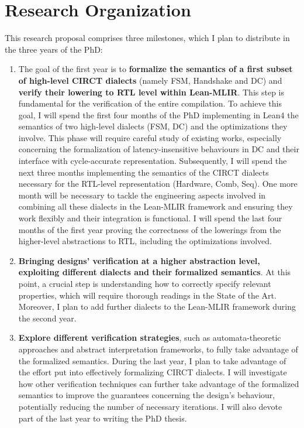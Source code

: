 \documentclass[sigconf,authorversion,nonacm, 11pt]{acmart}
\begin{document}
\section{Research Organization}

This research proposal comprises three milestones, which I plan to distribute in the three years of the PhD: 
\begin{enumerate}
    \item The goal of the first year is to \textbf{formalize the semantics of a first subset of high-level CIRCT dialects} (namely FSM, Handshake and DC) 
 and \textbf{verify their lowering to RTL level within Lean-MLIR}. This step is fundamental for the verification of the entire compilation. 
 To achieve this goal, I will spend the first four months of the PhD implementing in Lean4 the semantics of two high-level dialects (FSM, DC) and 
 the optimizations they involve. This phase will require careful study of existing works, especially concerning the formalization of latency-insensitive 
 behaviours in DC and their interface with cycle-accurate representation. 
 Subsequently, I will spend the next three months implementing the semantics of the CIRCT dialects necessary for the RTL-level representation (Hardware, Comb, Seq). 
 One more month will be necessary to tackle the engineering aspects involved in combining all these dialects in the Lean-MLIR framework and ensuring they work 
 flexibly and their integration is functional. I will spend the last four months of the first year proving the correctness of the lowerings from the higher-level 
 abstractions to RTL, including the optimizations involved. 
    \item \textbf{Bringing designs’ verification at a higher abstraction level, exploiting different dialects and their formalized semantics}. 
 At this point, a crucial step is understanding how to correctly specify relevant properties, which will require thorough readings in the State of the Art. 
 Moreover, I plan to add further dialects to the Lean-MLIR framework during the second year. 
    \item \textbf{Explore different verification strategies}, such as automata-theoretic approaches and abstract interpretation frameworks, 
 to fully take advantage of the formalized semantics. During the last year, I plan to take advantage of the effort put into effectively formalizing CIRCT dialects. I will investigate how other verification techniques can further take advantage of the formalized semantics to improve the 
 guarantees concerning the design’s behaviour, potentially reducing the number of necessary iterations. 
 I will also devote part of the last year to writing the PhD thesis. 
\end{enumerate}

\thispagestyle{empty}


\thispagestyle{empty}
\end{document}
